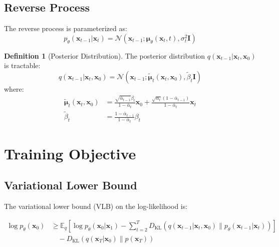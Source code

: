 \documentclass[11pt,a4paper]{article}
\theoremstyle{definition}
\newtheorem{definition}{Definition}[section]
\newcommand{\E}{\mathbb{E}}
\newcommand{\N}{\mathcal{N}}
\newcommand{\KL}{\text{KL}}
\begin{document}
\subsection{Reverse Process}

The reverse process is parameterized as:
\begin{equation}
    p_\theta(\mathbf{x}_{t-1} | \mathbf{x}_t) = \N(\mathbf{x}_{t-1}; \bm{\mu}_\theta(\mathbf{x}_t, t), \sigma_t^2\mathbf{I})
\end{equation}

\begin{definition}[Posterior Distribution]
    The posterior distribution $q(\mathbf{x}_{t-1} | \mathbf{x}_t, \mathbf{x}_0)$ is tractable:
    \begin{equation}
        q(\mathbf{x}_{t-1} | \mathbf{x}_t, \mathbf{x}_0) = \N(\mathbf{x}_{t-1}; \tilde{\bm{\mu}}_t(\mathbf{x}_t, \mathbf{x}_0), \tilde{\beta}_t\mathbf{I})
    \end{equation}
    where:
    \begin{align}
        \tilde{\bm{\mu}}_t(\mathbf{x}_t, \mathbf{x}_0) &= \frac{\sqrt{\bar{\alpha}_{t-1}}\beta_t}{1-\bar{\alpha}_t}\mathbf{x}_0 + \frac{\sqrt{\alpha_t}(1-\bar{\alpha}_{t-1})}{1-\bar{\alpha}_t}\mathbf{x}_t \\
        \tilde{\beta}_t &= \frac{1-\bar{\alpha}_{t-1}}{1-\bar{\alpha}_t}\beta_t
    \end{align}
\end{definition}

\section{Training Objective}

\subsection{Variational Lower Bound}

The variational lower bound (VLB) on the log-likelihood is:

\begin{align}
    \log p_\theta(\mathbf{x}_0) &\geq \E_q\left[\log p_\theta(\mathbf{x}_0|\mathbf{x}_1) - \sum_{t=2}^T D_{\KL}(q(\mathbf{x}_{t-1}|\mathbf{x}_t,\mathbf{x}_0) \| p_\theta(\mathbf{x}_{t-1}|\mathbf{x}_t))\right] \nonumber \\
    &\quad - D_{\KL}(q(\mathbf{x}_T|\mathbf{x}_0) \| p(\mathbf{x}_T))
    \label{eq:vlb}
\end{align}
\end{document}
